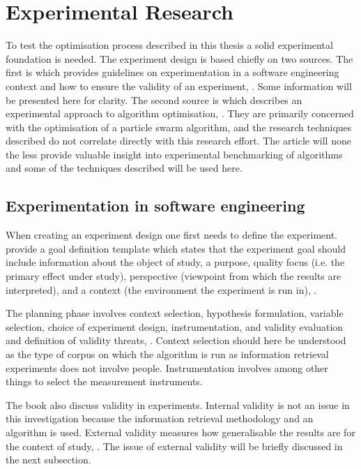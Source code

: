 \section{Experimental Research}
\label{ExperimentalResearch}
To test the optimisation process described in this thesis a solid experimental foundation is needed. The experiment design is based chiefly on two sources. The first is  which provides guidelines on experimentation in a software engineering context and how to ensure the validity of an experiment, \parencite{Wohlin2000}. Some information will be presented here for clarity. The second source is  which describes an experimental approach to algorithm optimisation, \parencite{Bartz-Beielstein2004}. They are primarily concerned with the optimisation of a particle swarm algorithm, and the research techniques described do not correlate directly with this research effort. The article will none the less  provide valuable insight into experimental benchmarking of algorithms and some of the techniques described will be used here. 

\subsection{Experimentation in software engineering}

When creating an experiment design one first needs to define the experiment. \citeauthor{Wohlin2000} provide a goal definition template which states that the experiment goal should include information about the object of study, a purpose, quality focus (i.e. the primary effect under study), perspective (viewpoint from which the results are interpreted), and a context (the environment the experiment is run in), \parencite{Wohlin2000}.

The planning phase involves context selection, hypothesis formulation, variable selection, choice of experiment design, instrumentation, and validity evaluation and definition of validity threats, \parencite{Wohlin2000}. Context selection should here be understood as the type of corpus on which the algorithm is run as information retrieval experiments does not involve people. Instrumentation involves among other things to select the measurement instruments.

The book also discuss validity in experiments. Internal validity is not an issue in this investigation because the information retrieval methodology and an algorithm is used. External validity measures how generalisable the results are for the context of study, \parencite{Wohlin2000}. The issue of external validity will be briefly discussed in the next subsection.

